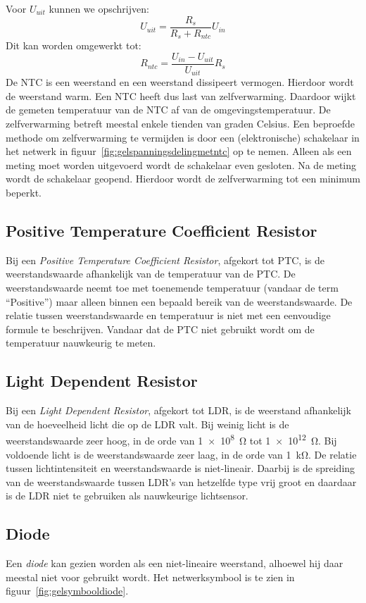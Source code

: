 Voor $U_{uit}$ kunnen we opschrijven:
%
\begin{equation}
U_{uit} = \dfrac{R_s}{R_s+R_{ntc}}U_{in}
\end{equation}
%
Dit kan worden omgewerkt tot:
%
\begin{equation}
R_{ntc} = \dfrac{U_{in}-U_{uit}}{U_{uit}}R_s
\end{equation}
%
De NTC is een weerstand en een weerstand dissipeert vermogen. Hierdoor wordt de weerstand warm. Een NTC heeft dus last van zelfverwarming. Daardoor wijkt de gemeten temperatuur van de NTC af van de omgevingstemperatuur. De zelfverwarming betreft meestal enkele tienden van graden Celsius. Een beproefde methode om zelfverwarming te vermijden is door een (elektronische) schakelaar in het netwerk in figuur~\ref{fig:gelspanningsdelingmetntc} op te nemen. Alleen als een meting moet worden uitgevoerd wordt de schakelaar even gesloten. Na de meting wordt de schakelaar geopend. Hierdoor wordt de zelfverwarming tot een minimum beperkt.

\subsection{Positive Temperature Coefficient Resistor}
Bij een \textsl{Positive Temperature Coefficient Resistor}, afgekort tot PTC, is de weerstandswaarde afhankelijk van de temperatuur van de PTC. De weerstandswaarde neemt toe met toenemende temperatuur (vandaar de term ``Positive'') maar alleen binnen een bepaald bereik van de weerstandswaarde. De relatie tussen weerstandswaarde en temperatuur is niet met een eenvoudige formule te beschrijven. Vandaar dat de PTC niet gebruikt wordt om de temperatuur nauwkeurig te meten.

\subsection{Light Dependent Resistor}
Bij een \textsl{Light Dependent Resistor}, afgekort tot LDR, is de weerstand afhankelijk van de hoeveelheid licht die op de LDR valt. Bij weinig licht is de weerstandswaarde zeer hoog, in de orde van \SI{1e8}{\ohm} tot \SI{1e12}{\ohm}. Bij voldoende licht is de weerstandswaarde zeer laag, in de orde van \SI{1}{\kilo\ohm}. De relatie tussen lichtintensiteit en weerstandswaarde is niet-lineair. Daarbij is de spreiding van de weerstandswaarde tussen LDR's van hetzelfde type vrij groot en daardaar is de LDR niet te gebruiken als nauwkeurige lichtsensor.

\subsection{Diode}
Een \textsl{diode} kan gezien worden als een niet-lineaire weerstand, alhoewel hij daar meestal niet voor gebruikt wordt. Het netwerksymbool is te zien in figuur~\ref{fig:gelsymbooldiode}.

